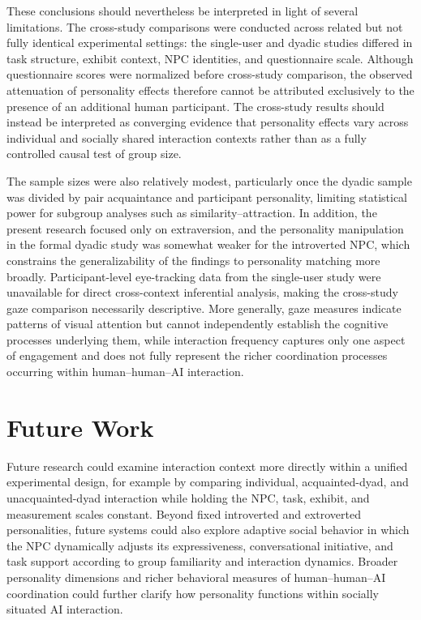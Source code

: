 \documentclass[a4paper,fleqn]{cas-sc}
\begin{document}
These conclusions should nevertheless be interpreted in light of several limitations. The cross-study comparisons were conducted across related but not fully identical experimental settings: the single-user and dyadic studies differed in task structure, exhibit context, NPC identities, and questionnaire scale. Although questionnaire scores were normalized before cross-study comparison, the observed attenuation of personality effects therefore cannot be attributed exclusively to the presence of an additional human participant. The cross-study results should instead be interpreted as converging evidence that personality effects vary across individual and socially shared interaction contexts rather than as a fully controlled causal test of group size.

The sample sizes were also relatively modest, particularly once the dyadic sample was divided by pair acquaintance and participant personality, limiting statistical power for subgroup analyses such as similarity--attraction. In addition, the present research focused only on extraversion, and the personality manipulation in the formal dyadic study was somewhat weaker for the introverted NPC, which constrains the generalizability of the findings to personality matching more broadly. Participant-level eye-tracking data from the single-user study were unavailable for direct cross-context inferential analysis, making the cross-study gaze comparison necessarily descriptive. More generally, gaze measures indicate patterns of visual attention but cannot independently establish the cognitive processes underlying them, while interaction frequency captures only one aspect of engagement and does not fully represent the richer coordination processes occurring within human--human--AI interaction.

\section{Future Work}

Future research could examine interaction context more directly within a unified experimental design, for example by comparing individual, acquainted-dyad, and unacquainted-dyad interaction while holding the NPC, task, exhibit, and measurement scales constant. Beyond fixed introverted and extroverted personalities, future systems could also explore adaptive social behavior in which the NPC dynamically adjusts its expressiveness, conversational initiative, and task support according to group familiarity and interaction dynamics. Broader personality dimensions and richer behavioral measures of human--human--AI coordination could further clarify how personality functions within socially situated AI interaction.
\end{document}

